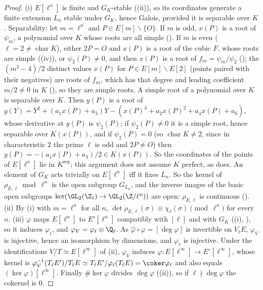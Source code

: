 \begin{proof}
(i) $E[\ell^n]$ is finite and $G_K$-stable ((ii)), so its coordinates generate a finite extension $L_n$ stable under $G_K$, hence Galois, provided it is
separable over $K$. Separability: let $m=\ell^n$ and $P\in E[m]\smallsetminus\{O\}$. If $m$ is odd, $x(P)$ is a root of $\psi_m$, a polynomial over $K$ whose roots are all
simple (). If $m$ is even ($\ell=2\ne\operatorname{char}K$), either $2P=O$ and $x(P)$ is a root of the cubic $F$, whose roots are simple
((iv)), or $\psi_2(P)\ne0$, and then $x(P)$ is a root of $f_m=\psi_m/\psi_2$ (); the
$(m^2-4)/2$ distinct values $x(P)$ for $P\in E[m]\smallsetminus E[2]$ (points paired with their negatives) are roots of $f_m$, which has that degree and leading
coefficient $m/2\ne0$ in $K$ (), so they are simple roots. A simple root of a polynomial over $K$ is separable over $K$. Then $y(P)$ is a root of
$g(Y)=Y^2+(a_1x(P)+a_3)Y-(x(P)^3+a_2x(P)^2+a_4x(P)+a_6)$, whose derivative at $y(P)$ is $\psi_2(P)$; if $\psi_2(P)\ne0$ it is a simple root, hence separable over
$K(x(P))$, and if $\psi_2(P)=0$ (so $\operatorname{char}K\ne2$, since in characteristic $2$ the prime $\ell$ is odd and $2P\ne O$) then $y(P)=-(a_1x(P)+a_3)/2\in K(x(P))$. So the coordinates of the points of $E[\ell^n]$ lie in
$K^{\mathrm{sep}}$; this argument does not assume $K$ perfect, as \cite[Section III.7]{SilvermanAEC} does. An element of $G_K$ acts trivially on $E[\ell^n]$ iff it fixes $L_n$. So the kernel of $\rho_{E,\ell}\bmod\ell^n$ is the open subgroup $G_{L_n}$, and the
inverse images of the basic open subgroups $\ker(\GL_2(\Z_\ell)\to\GL_2(\Z/\ell^n))$ are open: $\rho_{E,\ell}$ is continuous (). (ii) By (i)
with $m=\ell^n$ for all $n$, $\det\rho_{E,\ell}(\sigma)\equiv\chi_\ell(\sigma)\pmod{\ell^n}$ for every $n$. (iii) $\varphi$ maps $E[\ell^n]$ to $E'[\ell^n]$ compatibly with $[\ell]$ and
with $G_K$ ((i), ), so it induces $\varphi_\ell$, and $\varphi_V=\varphi_\ell\otimes\Q_\ell$. As $\hat\varphi\circ\varphi=[\deg\varphi]$ is
invertible on $V_\ell E$, $\varphi_V$ is injective, hence an isomorphism by dimensions, and $\varphi_\ell$ is injective. Under the identifications $V/T\simeq E[\ell^\infty]$ of
(ii), $\varphi_V$ induces $\varphi\colon E[\ell^\infty]\to E'[\ell^\infty]$, whose kernel is $\varphi_V^{-1}(T_\ell E')/T_\ell E\simeq T_\ell E'/\varphi_\ell(T_\ell E)=\coker\varphi_\ell$
and also equals $(\ker\varphi)[\ell^\infty]$. Finally $\#\ker\varphi$ divides $\deg\varphi$ ((ii)), so if $\ell\nmid\deg\varphi$ the cokernel is $0$.
\end{proof}

